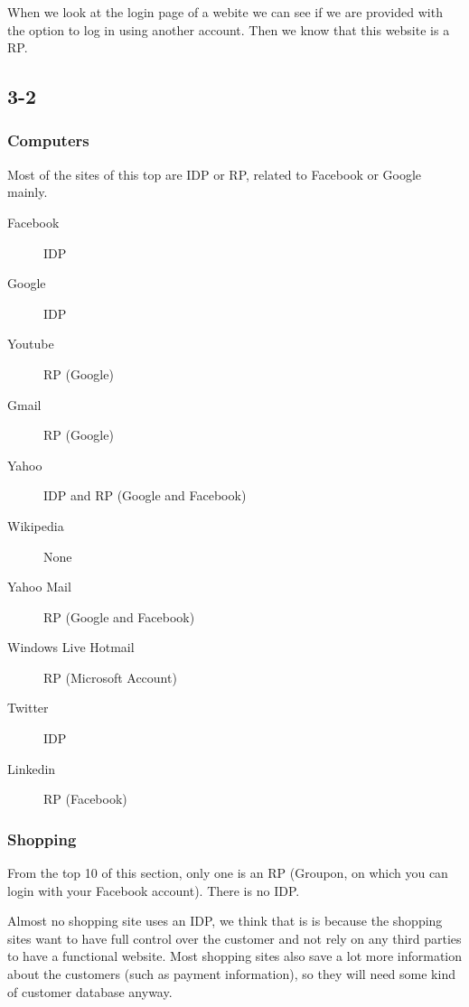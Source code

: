 \documentclass[12pt]{article}
\begin{document}
When we look at the login page of a webite we can see if we are provided with the option to log in using another account. Then we know that this website is a RP. 

\subsection*{3-2}

\begin{minipage}[t]{0.5\textwidth}

\subsubsection*{Computers}

Most of the sites of this top are IDP or RP, related to Facebook or Google mainly.

\begin{description}
\item[Facebook] IDP
\item[Google] IDP
\item[Youtube] RP (Google)
\item[Gmail] RP (Google)
\item[Yahoo] IDP and RP (Google and Facebook)
\item[Wikipedia] None
\item[Yahoo Mail] RP (Google and Facebook)
\item[Windows Live Hotmail] RP (Microsoft Account)
\item[Twitter] IDP
\item[Linkedin] RP (Facebook)
\end{description}
\end{minipage}
\begin{minipage}[t]{0.5\textwidth}

\subsubsection*{Shopping}

From the top 10 of this section, only one is an RP (Groupon, on which you can login with your Facebook account). There is no IDP.

\end{minipage}

Almost no shopping site uses an IDP, we think that is is because the shopping sites want to have full control over the customer and not rely on any third parties to have a functional website. Most shopping sites also save a lot more information about the customers (such as payment information), so they will need some kind of customer database anyway.
\end{document}
